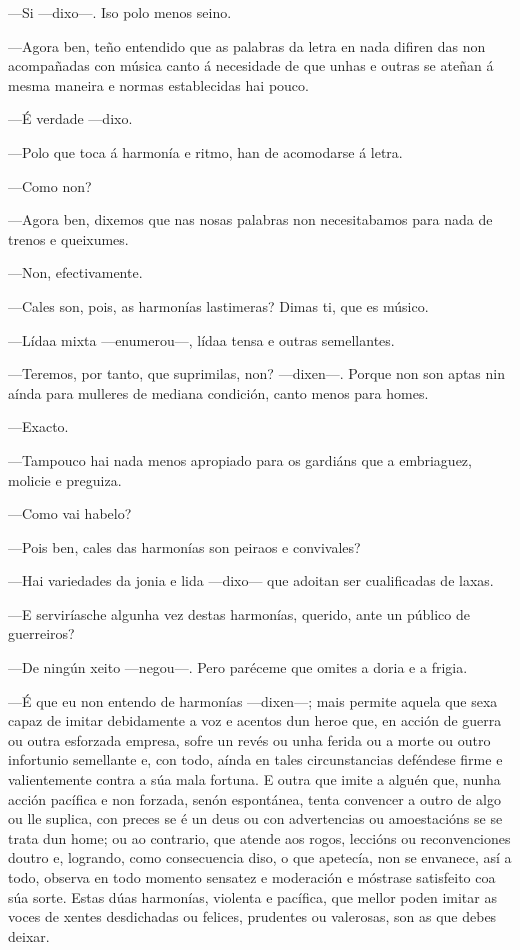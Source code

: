 —Si —dixo—. Iso polo menos seino.

—Agora ben, teño entendido que as palabras da letra en nada difiren das non acompañadas con música canto á necesidade de que unhas e outras se ateñan á mesma maneira e normas establecidas hai pouco.

—É verdade —dixo.

—Polo que toca á harmonía e ritmo, han de acomodarse á letra.

—Como non?

—Agora ben, dixemos que nas nosas palabras non necesitabamos para nada de trenos e queixumes.

—Non, efectivamente.

—Cales son, pois, as harmonías lastimeras? Dimas ti, que es músico.

—Lídaa mixta —enumerou—, lídaa tensa e outras semellantes.

—Teremos, por tanto, que suprimilas, non? —dixen—. Porque non son aptas nin aínda para mulleres de mediana condición, canto menos para homes.

—Exacto.

—Tampouco hai nada menos apropiado para os gardiáns que a embriaguez, molicie e preguiza.

—Como vai habelo?

—Pois ben, cales das harmonías son peiraos e convivales?

—Hai variedades da jonia e lida —dixo— que adoitan ser cualificadas de laxas.

—E serviríasche algunha vez destas harmonías, querido, ante un público de guerreiros?

—De ningún xeito —negou—. Pero paréceme que omites a doria e a frigia.

—É que eu non entendo de harmonías —dixen—; mais permite aquela que sexa capaz de imitar debidamente a voz e acentos dun heroe que, en acción de guerra ou outra esforzada empresa, sofre un revés ou unha ferida ou a morte ou outro infortunio semellante e, con todo, aínda en tales circunstancias deféndese firme e valientemente contra a súa mala fortuna. E outra que imite a alguén que, nunha acción pacífica e non forzada, senón espontánea, tenta convencer a outro de algo ou lle suplica, con preces se é un deus ou con advertencias ou amoestacións se se trata dun home; ou ao contrario, que atende aos rogos, leccións ou reconvenciones doutro e, logrando, como consecuencia diso, o que apetecía, non se envanece, así a todo, observa en todo momento sensatez e moderación e móstrase satisfeito coa súa sorte. Estas dúas harmonías, violenta e pacífica, que mellor poden imitar as voces de xentes desdichadas ou felices, prudentes ou valerosas, son as que debes deixar.


